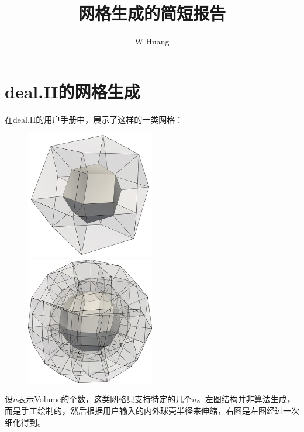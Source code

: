 \documentclass[lang=cn,11pt,a4paper]{elegantpaper}
\title{网格生成的简短报告}
\author{W Huang}
\date{\zhtoday}
\begin{document}
\maketitle

\section{deal.II的网格生成}

在deal.II的用户手册中，展示了这样的一类网格：

\begin{figure}[H]
    \centering
    \begin{minipage}[t]{0.45\textwidth}
        \centering
        \includegraphics[width=0.5\textwidth]{png/hypershell3d-12.png}
    \end{minipage}
    \begin{minipage}[t]{0.45\textwidth}
        \centering
        \includegraphics[width=0.5\textwidth]{png/hypershell3d-96.png}
    \end{minipage}
\end{figure}

设$n$表示Volume的个数，这类网格只支持特定的几个$n$。左图结构并非算法生成，而是手工绘制的，然后根据用户输入的内外球壳半径来伸缩，右图是左图经过一次细化得到。
\end{document}
